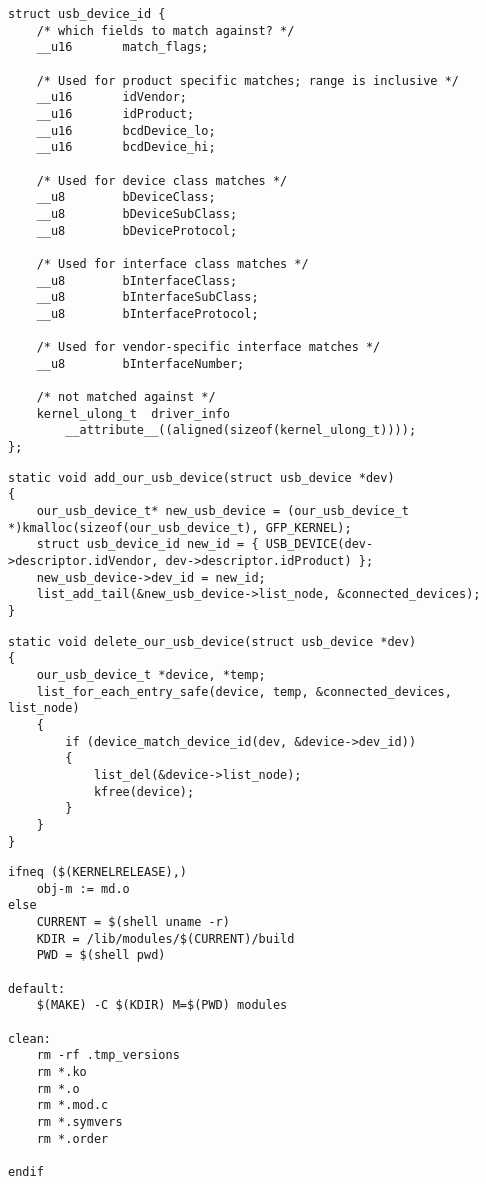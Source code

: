   \begin{lstlisting}[caption = Структура usb\_device\_id, label =  lst:usb_device_id]
 struct usb_device_id {
	/* which fields to match against? */
	__u16		match_flags;

	/* Used for product specific matches; range is inclusive */
	__u16		idVendor;
	__u16		idProduct;
	__u16		bcdDevice_lo;
	__u16		bcdDevice_hi;

	/* Used for device class matches */
	__u8		bDeviceClass;
	__u8		bDeviceSubClass;
	__u8		bDeviceProtocol;

	/* Used for interface class matches */
	__u8		bInterfaceClass;
	__u8		bInterfaceSubClass;
	__u8		bInterfaceProtocol;

	/* Used for vendor-specific interface matches */
	__u8		bInterfaceNumber;

	/* not matched against */
	kernel_ulong_t	driver_info
		__attribute__((aligned(sizeof(kernel_ulong_t))));
};
 \end{lstlisting}

  \begin{lstlisting}[caption = Добавление usb устройства, label =  lst:add_usb]
static void add_our_usb_device(struct usb_device *dev)
{
    our_usb_device_t* new_usb_device = (our_usb_device_t *)kmalloc(sizeof(our_usb_device_t), GFP_KERNEL);
    struct usb_device_id new_id = { USB_DEVICE(dev->descriptor.idVendor, dev->descriptor.idProduct) };
    new_usb_device->dev_id = new_id;
    list_add_tail(&new_usb_device->list_node, &connected_devices);
}
 \end{lstlisting}
 
  \begin{lstlisting}[caption = Удаление usb устройства, label =  lst:del_usb]
static void delete_our_usb_device(struct usb_device *dev)
{
    our_usb_device_t *device, *temp;
    list_for_each_entry_safe(device, temp, &connected_devices, list_node) 
    {
        if (device_match_device_id(dev, &device->dev_id))
        {
            list_del(&device->list_node);
            kfree(device);
        }
    }
}
 \end{lstlisting}
 
  \begin{lstlisting}[caption = Makefile, label =  lst:makefile]
ifneq ($(KERNELRELEASE),)
	obj-m := md.o
else
	CURRENT = $(shell uname -r)
	KDIR = /lib/modules/$(CURRENT)/build
	PWD = $(shell pwd)

default:
	$(MAKE) -C $(KDIR) M=$(PWD) modules

clean:
	rm -rf .tmp_versions
	rm *.ko
	rm *.o
	rm *.mod.c
	rm *.symvers
	rm *.order

endif
 \end{lstlisting}
 
